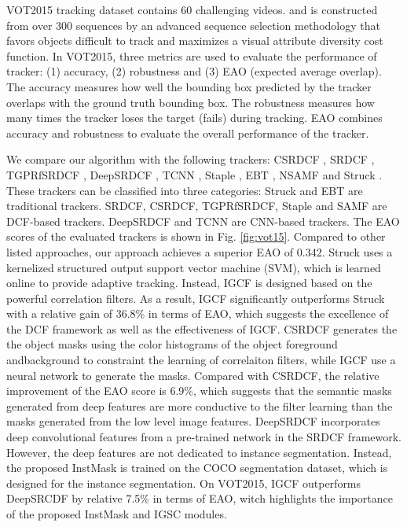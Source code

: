 \documentclass[review]{elsarticle}
\begin{document}
\begin{CJK*}{UTF8}{gbsn}
VOT2015 \cite{Kristan2015TheVO} tracking dataset contains 60 challenging videos. and is constructed from over 300 sequences by an advanced sequence selection methodology that favors objects difficult to track and maximizes a visual attribute diversity cost function. 
In VOT2015, three metrics are used to evaluate the performance of  tracker: (1) accuracy, (2) robustness and (3) EAO (expected average overlap). The accuracy measures how well the bounding box predicted by the tracker overlaps with the ground truth bounding box. The robustness measures how many times the tracker loses the target (fails) during tracking. EAO combines accuracy and robustness to evaluate the overall performance of the tracker. 

We compare our algorithm with the following trackers: CSRDCF \cite{Lukezic2017DiscriminativeCF}, SRDCF \cite{Danelljan2015LearningSR}, TGPRfSRDCF \cite{gao2018tracking}, DeepSRDCF \cite{Danelljan2015ConvolutionalFF}, TCNN \cite{nam2016modeling}, Staple \cite{Bertinetto2016StapleC}, EBT \cite{Zhu2016BeyondLS},  NSAMF \cite{Hua2015OnlineOT} and Struck \cite{Hare2011StruckSO}.
These trackers can be classified into three categories: Struck and EBT are traditional trackers. SRDCF, CSRDCF, TGPRfSRDCF, Staple and SAMF are DCF-based trackers. DeepSRDCF and TCNN are CNN-based trackers.
The EAO scores of the evaluated trackers is shown in Fig. \ref{fig:vot15}. Compared to other listed approaches, our approach achieves a superior EAO of 0.342. 
Struck uses a kernelized structured output support vector machine (SVM), which is learned online to provide adaptive tracking. Instead, IGCF is designed based on the powerful correlation filters. As a result, IGCF significantly outperforms Struck with a relative gain of 36.8\% in terms of EAO, which suggests the excellence of the DCF framework as well as the effectiveness of IGCF.
CSRDCF generates the the object masks using the color histograms of the object foreground andbackground to constraint the learning of correlaiton filters, while IGCF use a neural network to generate the masks. Compared with CSRDCF, the relative improvement of the EAO score is 6.9\%, which suggests that the semantic masks generated from deep features are more conductive to the filter learning than the masks generated from the low level image features.
DeepSRDCF incorporates deep convolutional features from a pre-trained network in the SRDCF framework. However, the deep features are not dedicated to instance segmentation. Instead, the proposed InstMask is trained on the COCO segmentation dataset, which is designed for the instance segmentation. On VOT2015, IGCF outperforms DeepSRCDF by relative 7.5\% in terms of EAO, witch highlights the importance of the proposed InstMask and IGSC modules.


\end{CJK*}
\end{document}

